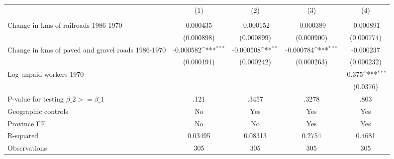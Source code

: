 {
\def\sym#1{\ifmmode^{#1}\else\(^{#1}\)\fi}
\begin{tabular}{l*{4}{c}}
\hline\hline
                &\multicolumn{1}{c}{(1)}&\multicolumn{1}{c}{(2)}&\multicolumn{1}{c}{(3)}&\multicolumn{1}{c}{(4)}\\
                &\multicolumn{1}{c}{}&\multicolumn{1}{c}{}&\multicolumn{1}{c}{}&\multicolumn{1}{c}{}\\
\hline
Change in kms of railroads 1986-1970& 0.000435         &-0.000152         &-0.000389         &-0.000891         \\
                &(0.000898)         &(0.000899)         &(0.000900)         &(0.000774)         \\
[1em]
Change in kms of paved and gravel roads 1986-1970&-0.000582\sym{***}&-0.000508\sym{**} &-0.000784\sym{***}&-0.000237         \\
                &(0.000191)         &(0.000242)         &(0.000263)         &(0.000232)         \\
[1em]
Log unpaid workers 1970&                  &                  &                  &   -0.375\sym{***}\\
                &                  &                  &                  & (0.0376)         \\
\hline
P-value for testing $\beta\_{2} >= \beta\_{1}$&     .121         &    .3457         &    .3278         &     .803         \\
Geographic controls&       No         &      Yes         &      Yes         &      Yes         \\
Province FE     &       No         &       No         &      Yes         &      Yes         \\
R-squared       &  0.03495         &  0.08313         &   0.2754         &   0.4681         \\
Observations    &      305         &      305         &      305         &      305         \\
\hline\hline
\end{tabular}
}
